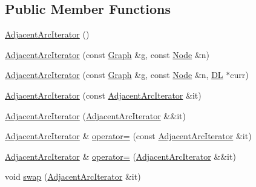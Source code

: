 \subsection*{Public Member Functions}
\begin{DoxyCompactItemize}
\item 
\hyperlink{class_designar_1_1_graph_1_1_adjacent_arc_iterator_a36fe9a05d139c9e44dc4ff6a47d41416}{Adjacent\+Arc\+Iterator} ()
\item 
\hyperlink{class_designar_1_1_graph_1_1_adjacent_arc_iterator_a2a16b2ab702ca71cf8561ea8ebc4ec72}{Adjacent\+Arc\+Iterator} (const \hyperlink{class_designar_1_1_graph}{Graph} \&g, const \hyperlink{class_designar_1_1_graph_a5dfc7dba9d092ac489c72e40390c37d0}{Node} \&n)
\item 
\hyperlink{class_designar_1_1_graph_1_1_adjacent_arc_iterator_a97e3e5909f6e9b9b6b55cbc0fb2d5263}{Adjacent\+Arc\+Iterator} (const \hyperlink{class_designar_1_1_graph}{Graph} \&g, const \hyperlink{class_designar_1_1_graph_a5dfc7dba9d092ac489c72e40390c37d0}{Node} \&n, \hyperlink{class_designar_1_1_d_l}{DL} $\ast$curr)
\item 
\hyperlink{class_designar_1_1_graph_1_1_adjacent_arc_iterator_af536d3124c826e57fdfd98b604338960}{Adjacent\+Arc\+Iterator} (const \hyperlink{class_designar_1_1_graph_1_1_adjacent_arc_iterator}{Adjacent\+Arc\+Iterator} \&it)
\item 
\hyperlink{class_designar_1_1_graph_1_1_adjacent_arc_iterator_afe1c65c9b34d57572217f33e4adc4200}{Adjacent\+Arc\+Iterator} (\hyperlink{class_designar_1_1_graph_1_1_adjacent_arc_iterator}{Adjacent\+Arc\+Iterator} \&\&it)
\item 
\hyperlink{class_designar_1_1_graph_1_1_adjacent_arc_iterator}{Adjacent\+Arc\+Iterator} \& \hyperlink{class_designar_1_1_graph_1_1_adjacent_arc_iterator_acd4f3584de04e7787b39b133bb9547ad}{operator=} (const \hyperlink{class_designar_1_1_graph_1_1_adjacent_arc_iterator}{Adjacent\+Arc\+Iterator} \&it)
\item 
\hyperlink{class_designar_1_1_graph_1_1_adjacent_arc_iterator}{Adjacent\+Arc\+Iterator} \& \hyperlink{class_designar_1_1_graph_1_1_adjacent_arc_iterator_a7dd872294198ccd6d38267629a65363f}{operator=} (\hyperlink{class_designar_1_1_graph_1_1_adjacent_arc_iterator}{Adjacent\+Arc\+Iterator} \&\&it)
\item 
void \hyperlink{class_designar_1_1_graph_1_1_adjacent_arc_iterator_a3a1ed1df16f67214b5664fe9e54f23f4}{swap} (\hyperlink{class_designar_1_1_graph_1_1_adjacent_arc_iterator}{Adjacent\+Arc\+Iterator} \&it)
\item 

\end{DoxyCompactItemize}
